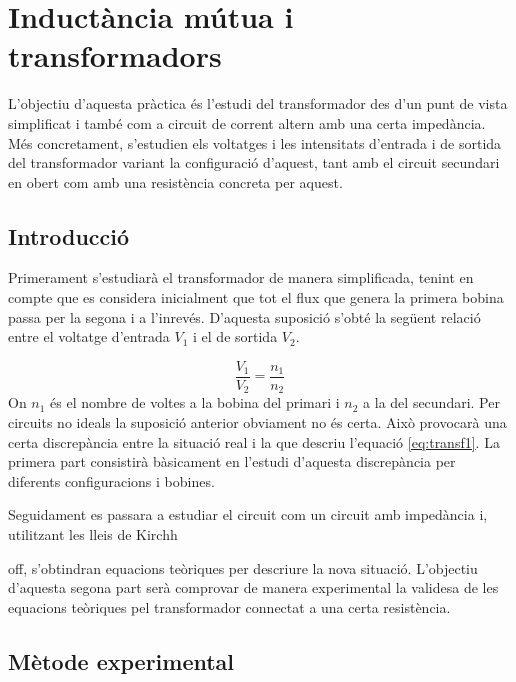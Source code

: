 \chapter{Inductància mútua i transformadors}

\begin{resum}
L'objectiu d'aquesta pràctica és l'estudi del transformador des d'un punt de vista simplificat i també com a circuit de corrent altern amb una certa impedància. Més concretament, s'estudien els voltatges i les intensitats d'entrada i de sortida del transformador variant la configuració d'aquest, tant amb el circuit secundari en obert com amb una resistència concreta per aquest.
\end{resum}

\section{Introducció}\label{sec:introducció}

Primerament s'estudiarà el transformador de manera simplificada, tenint en compte que es considera inicialment que tot el flux que genera la primera bobina passa per la segona i a l'inrevés. D'aquesta suposició s'obté la següent relació entre el voltatge d'entrada $V_1$ i el de sortida $V_2$. 

\begin{equation}\label{eq:transf1}
    \frac{V_1}{V_2}=\frac{n_1}{n_2}
\end{equation}
On $n_1$ és el nombre de voltes a la bobina del primari i $n_2$ a la del secundari. Per circuits no ideals la suposició anterior obviament no és certa. Això provocarà una certa discrepància entre la situació real i la que descriu l'equació \cref{eq:transf1}. La primera part consistirà bàsicament en l'estudi d'aquesta discrepància per diferents configuracions i bobines.

Seguidament es passara a estudiar el circuit com un circuit amb impedància i, utilitzant les lleis de Kirchh



off, s'obtindran equacions teòriques per descriure la nova situació. L'objectiu d'aquesta segona part serà comprovar de manera experimental la validesa de les equacions teòriques pel transformador connectat a una certa resistència.

\section{Mètode experimental}\label{sec:met}

